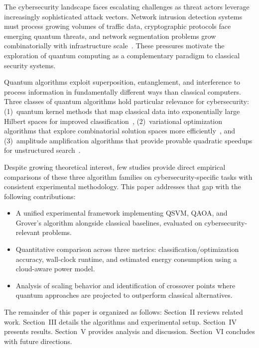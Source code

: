 \documentclass[conference]{IEEEtran}
\begin{document}
The cybersecurity landscape faces escalating challenges as threat actors leverage increasingly sophisticated attack vectors. Network intrusion detection systems must process growing volumes of traffic data, cryptographic protocols face emerging quantum threats, and network segmentation problems grow combinatorially with infrastructure scale~\cite{bernstein2017post}. These pressures motivate the exploration of quantum computing as a complementary paradigm to classical security systems.

Quantum algorithms exploit superposition, entanglement, and interference to process information in fundamentally different ways than classical computers. Three classes of quantum algorithms hold particular relevance for cybersecurity: (1)~quantum kernel methods that map classical data into exponentially large Hilbert spaces for improved classification~\cite{havlicek2019supervised}, (2)~variational optimization algorithms that explore combinatorial solution spaces more efficiently~\cite{farhi2014quantum}, and (3)~amplitude amplification algorithms that provide provable quadratic speedups for unstructured search~\cite{grover1996fast}.

Despite growing theoretical interest, few studies provide direct empirical comparisons of these three algorithm families on cybersecurity-specific tasks with consistent experimental methodology. This paper addresses that gap with the following contributions:

\begin{itemize}
    \item A unified experimental framework implementing QSVM, QAOA, and Grover's algorithm alongside classical baselines, evaluated on cybersecurity-relevant problems.
    \item Quantitative comparison across three metrics: classification/optimization accuracy, wall-clock runtime, and estimated energy consumption using a cloud-aware power model.
    \item Analysis of scaling behavior and identification of crossover points where quantum approaches are projected to outperform classical alternatives.
\end{itemize}

The remainder of this paper is organized as follows: Section~II reviews related work. Section~III details the algorithms and experimental setup. Section~IV presents results. Section~V provides analysis and discussion. Section~VI concludes with future directions.

\end{document}
